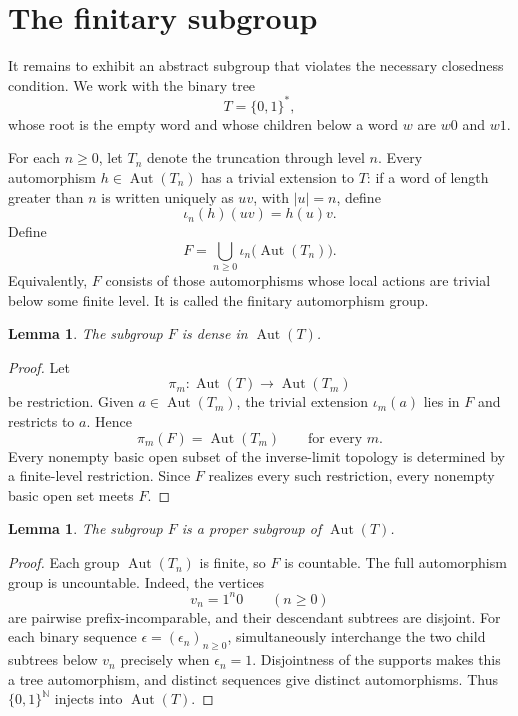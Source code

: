 \documentclass[10pt,reqno]{amsart}
\newtheorem{lemma}[theorem]{Lemma}
\theoremstyle{definition}
\begin{document}
\section{The finitary subgroup}

It remains to exhibit an abstract subgroup that violates the necessary
closedness condition.  We work with the binary tree
\[
 T=\{0,1\}^{*},
\]
whose root is the empty word and whose children below a word \(w\) are
\(w0\) and \(w1\).

For each \(n\geq 0\), let \(T_n\) denote the truncation through level \(n\).
Every automorphism \(h\in\operatorname{Aut}(T_n)\) has a trivial extension
to \(T\): if a word of length greater than \(n\) is written uniquely as
\(uv\), with \(\lvert u\rvert=n\), define
\[
 \iota_n(h)(uv)=h(u)v.
\]
Define
\[
 F=\bigcup_{n\geq0}\iota_n\bigl(\operatorname{Aut}(T_n)\bigr).
\]
Equivalently, \(F\) consists of those automorphisms whose local actions are
trivial below some finite level.  It is called the finitary automorphism
group.

\begin{lemma}\label{lem:dense}
The subgroup \(F\) is dense in \(\operatorname{Aut}(T)\).
\end{lemma}

\begin{proof}
Let
\[
 \pi_m:\operatorname{Aut}(T)\longrightarrow\operatorname{Aut}(T_m)
\]
be restriction.  Given \(a\in\operatorname{Aut}(T_m)\), the trivial
extension \(\iota_m(a)\) lies in \(F\) and restricts to \(a\).  Hence
\[
 \pi_m(F)=\operatorname{Aut}(T_m)
 \qquad\text{for every }m.
\]
Every nonempty basic open subset of the inverse-limit topology is determined
by a finite-level restriction.  Since \(F\) realizes every such restriction,
every nonempty basic open set meets \(F\).
\end{proof}

\begin{lemma}\label{lem:proper}
The subgroup \(F\) is a proper subgroup of \(\operatorname{Aut}(T)\).
\end{lemma}

\begin{proof}
Each group \(\operatorname{Aut}(T_n)\) is finite, so \(F\) is countable.
The full automorphism group is uncountable.  Indeed, the vertices
\[
 v_n=1^n0\qquad(n\geq0)
\]
are pairwise prefix-incomparable, and their descendant subtrees are
disjoint.  For each binary sequence \(\epsilon=(\epsilon_n)_{n\geq0}\),
simultaneously interchange the two child subtrees below \(v_n\) precisely
when \(\epsilon_n=1\).  Disjointness of the supports makes this a tree
automorphism, and distinct sequences give distinct automorphisms.  Thus
\(\{0,1\}^{\mathbb N}\) injects into \(\operatorname{Aut}(T)\).
\end{proof}
\end{document}
